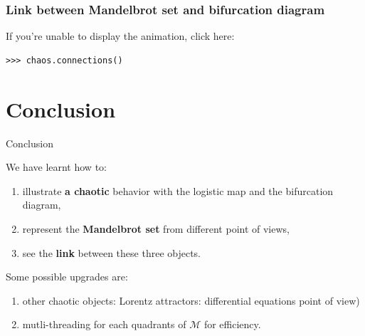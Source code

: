 \documentclass[11pt, compress, tikz]{beamer}
\theoremstyle{definition}
\begin{document}
\begin{frame}[fragile]
\frametitle{Link between Mandelbrot set and bifurcation diagram}
If you're unable to display the animation, click here:
\href{https://www.youtube.com/watch?v=xYQbqML1eE4}{}
\begin{verbatim}
>>> chaos.connections()
\end{verbatim}


\end{frame}

\section[]{Conclusion}
\begin{frame}{Conclusion}
\begin{center}
We have learnt how to:
\end{center}
\begin{box2}{
\begin{enumerate}[label=$\bullet$]
\item illustrate \textbf{a chaotic} behavior with the logistic map and the bifurcation diagram,
\item represent the \textbf{Mandelbrot set} from different point of views,
\item see the \textbf{link} between these three objects.
\end{enumerate}}
\end{box2}
\begin{center}
Some possible upgrades are:
\end{center}
\begin{box2}{
\begin{enumerate}[label=\ding{42}]
\item other chaotic objects: Lorentz attractors: differential equations point of view)
\item mutli-threading for each quadrants of $\mathcal{M}$ for efficiency.
\end{enumerate}}
\end{box2}
\end{frame}  
\end{document}
